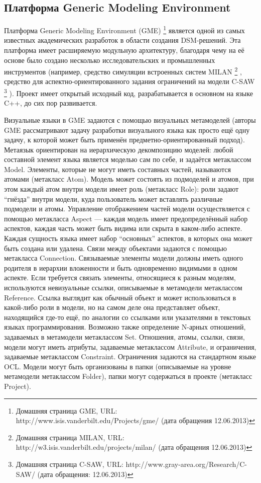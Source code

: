 \subsection{Платформа Generic Modeling Environment}
Платформа Generic Modeling Environment (GME)%
\footnote{Домашняя страница GME, URL: http://www.isis.vanderbilt.edu/Projects/gme/ (дата обращения 12.06.2013)}
\cite{ledeczi2001generic} является одной из самых известных академических разработок в области создания DSM-решений. 
Эта платформа имеет расширяемую модульную архитектуру, благодаря чему на её основе было создано 
несколько исследовательских и промышленных инструментов (например, средство симуляции встроенных систем MILAN%
\footnote{Домашняя страница MILAN, URL: http://w3.isis.vanderbilt.edu/projects/milan/ (дата обращения 12.06.2013)}%
, средство для аспектно-ориентированного задания ограничений на модели C-SAW%
\footnote{Домашняя страница C-SAW, URL: http://www.gray-area.org/Research/C-SAW/ (дата обращения: 12.06.2013)}%
). Проект имеет открытый исходный код, разрабатывается в основном на языке C++, до сих пор развивается.

Визуальные языки в GME задаются с помощью визуальных метамоделей (авторы GME рассматривают 
задачу разработки визуального языка как просто ещё одну задачу, к которой может быть 
применён предметно-ориентированный подход). Метаязык ориентирован на иерархическую 
декомпозицию моделей: любой составной элемент языка является моделью сам по себе, и 
задаётся метаклассом Model. Элементы, которые не могут иметь составных частей, называются 
атомами (метакласс Atom). Модель может состоять из подмоделей и атомов, при этом каждый 
атом внутри модели имеет роль (метакласс Role): роли задают "`гнёзда"' внутри модели, 
куда пользователь может вставлять различные подмодели и атомы. Управление отображением 
частей модели осуществляется с помощью метакласса Aspect --- каждая модель имеет предопределённый 
набор аспектов, каждая часть может быть видима или скрыта в каком-либо аспекте. Каждая 
сущность языка имеет набор "`основных"' аспектов, в которых она может быть создана 
или удалена. Связи между объектами задаются с помощью метакласса Connection. Связываемые 
элементы модели должны иметь одного родителя в иерархии вложенности и быть одновременно 
видимыми в одном аспекте. Если требуется связать элементы, относящиеся к разным моделям, 
используются невизуальные ссылки, описываемые в метамодели метаклассом Reference. Ссылка 
выглядит как обычный объект и может использоваться в какой-либо роли в модели, но на 
самом деле она представляет объект, находящийся где-то ещё, по аналогии со ссылками 
или указателями в текстовых языках программирования. Возможно также определение N-арных 
отношений, задаваемых в метамодели метаклассом Set. Отношения, атомы, ссылки, связи, 
модели могут иметь атрибуты, задаваемые метаклассом Attribute, и ограничения, задаваемые 
метаклассом Constraint. Ограничения задаются на стандартном языке OCL. Модели могут 
быть организованы в папки (описываемые на уровне метамодели метаклассом Folder), папки 
могут содержаться в проекте (метакласс Project).

